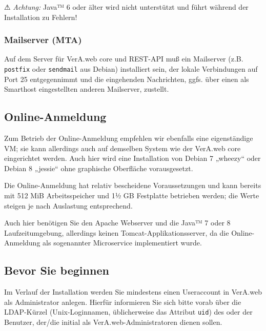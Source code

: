 ⚠ \emph{Achtung:} Java™ 6 oder älter wird nicht unterstützt
und führt während der Installation zu Fehlern!

\subsubsection{Mailserver (MTA)}\label{subsubsec:req-core-mta}

Auf dem Server für VerA.web core und REST-API muß ein Mailserver
(z.B. \texttt{postfix} oder \texttt{sendmail} aus Debian)
installiert sein, der lokale Verbindungen auf Port 25 entgegennimmt
und die eingehenden Nachrichten, ggfs. über einen als Smarthost
eingestellten anderen Mailserver, zustellt.

\ifoa

\subsection{Online-Anmeldung}\label{subseq:req-oa}

Zum Betrieb der Online-Anmeldung empfehlen wir ebenfalls eine
eigenständige VM; sie kann allerdings auch auf demselben System
wie der VerA.web core eingerichtet werden. Auch hier wird eine
Installation von Debian 7 „wheezy“ oder Debian 8 „jessie“ ohne
graphische Oberfläche vorausgesetzt.

Die Online-Anmeldung hat relativ bescheidene Voraussetzungen
und kann bereits mit 512 MiB Arbeitsspeicher und 1½ GB Festplatte
betrieben werden; die Werte steigen je nach Auslastung entsprechend.

Auch hier benötigen Sie den Apache Webserver und die Java™ 7 oder 8
Laufzeitumgebung, allerdings keinen Tomcat-Applikationsserver, da
die Online-Anmeldung als sogenannter Microservice implementiert wurde.

\fi%

\ifupgradeanleitung\else%

\subsection{Bevor Sie beginnen}\label{subsec:req-prereq}

Im Verlauf der Installation werden Sie mindestens einen Useraccount
in VerA.web als Administrator anlegen. Hierfür informieren Sie sich
bitte vorab über die LDAP-Kürzel (Unix-Loginnamen, üblicherweise das
Attribut \texttt{uid}) des oder der Benutzer, der/die initial als
VerA.web-Administratoren dienen sollen.

